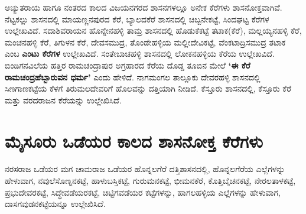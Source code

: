 ಅಚ್ಯುತರಾಯ ಹಾಗೂ ನಂತರದ ಕಾಲದ ವಿಜಯನಗರದ ಶಾಸನಗಳಲ್ಲೂ ಅನೇಕ ಕೆರೆಗಳು ಶಾಸನೋಕ್ತವಾಗಿವೆ. ನೆಟ್ಟಕಲ್ಲು ಶಾಸನದಲ್ಲಿ ಮಾಯಣ್ಣನಪುರದ ಕೆರೆ, ಬ್ಯಾಲದಕೆರೆ ಶಾಸನದಲ್ಲಿ ಚಿಬ್ಬನೇಕಟ್ಟೆ, ಸಿಂದಘಟ್ಟ ಕೆರೆಗಳ ಉಲ್ಲೇಖವಿದೆ. ಸದಾಶಿವರಾಯನ ಹೊನ್ನೇನಹಳ್ಳಿ ತಾಮ್ರ ಶಾಸನದಲ್ಲಿ ಹೊಡುಕೆಕಟ್ಟೆ ತಟಾಕ(ಕೆರೆ), ಮಲ್ಲಯ್ಯನಹಳ್ಳಿ ಕೆರೆ, ಮಂಚನಹಳ್ಳಿ ಕೆರೆ, ತಿಗುಳನ ಕೆರೆ, ದೇವಸಮುದ್ರ, ತೊಂಡೇಹಳ್ಳಿಯ ಮಲ್ಲೀದೇವಿಕಟ್ಟೆ, ವೆಂಕಟಾದ್ರಿಸಮುದ್ರ ತಟಾಕ ಎಂಬ \textbf{ಎಂಟು ಕೆರೆಗಳ} ಉಲ್ಲೇಖವಿದೆ. ಸಂತೇಬಾಚಹಳ್ಳಿ ಶಾಸನದಲ್ಲಿ ಲೋಕನಹಳ್ಳಿಯ ಕೆರೆಯ ಉಲ್ಲೇಖವಿದೆ. ಬಿಂಡಿಗನವಿಲೆಯ ಹತ್ತಿರ ರಾಮಚಂದ್ರಾಪುರ ಅಗ್ರಹಾರದ ಕೆರೆಯ ದೊಡ್ಡ ತೂಬಿನ ಮೇಲೆ \textbf{‘ಈ ಕೆರೆ ರಾಮಚಂದ್ರಹೆಬ್ಬಾರುವನ ಧರ್ಮ’} ಎಂದು ಹೇಳಿದೆ. ನಾಗಮಂಗಲ ತಾಲ್ಲೂಕು ದೇವರಹಳ್ಳಿ ಶಾಸನದಲ್ಲಿ ಸಿಣಗಾಣಕಟ್ಟೆಯ ಕೆಳಗೆ ತಿರುಮಲದೇವರಿಗೆ ಹೊಲವನ್ನು ದತ್ತಿಯಾಗಿ ನೀಡಿದೆ. ಕೆಸ್ತೂರು ಶಾಸನದಲ್ಲಿ, ಕೆಸ್ತೂರು ಕೆರೆ ಮತ್ತು ವರದರಾಜನ ಕೆರೆಯನ್ನು ಉಲ್ಲೇಖಿಸಿದೆ.

\section*{ಮೈಸೂರು ಒಡೆಯರ ಕಾಲದ ಶಾಸನೋಕ್ತ ಕೆರೆಗಳು}

ನರಸರಾಜ ಒಡೆಯರ ಮಗ ಚಾಮರಾಜ ಒಡೆಯರ ಹೊನ್ನಲಗೆರೆ ದತ್ತಿಶಾಸನದಲ್ಲಿ, ಹೊನ್ನಲಗೆರೆಯ ಎಲ್ಲೆಗಳನ್ನು ಹೇಳುವಾಗ, ನವುಲೆಸೊಣ್ನನಕಟ್ಟೆ, ಹಾಳುಬಸ್ತಿಕಟ್ಟೆ, ಗುರುಮನಕಟ್ಟೆ, ಭೀಮನಕೆರೆ, ಕೊತ್ತಿಬೈಚನಕಟ್ಟೆ, ನೇರಲತಾಳಕಟ್ಟೆ, ಪ್ರಭುದೇವರಕಟ್ಟೆ, ಸಿದ್ಧೇವಡೆಯರಕಟ್ಟೆ, ಚಿಟ್ಟಿಗವಡೆಯರ ಕಟ್ಟೆಗಳನ್ನು, ಹಾಗಲಹಳ್ಳಿಯ ಎಲ್ಲೆಗಳನ್ನು ಹೇಳುವಾಗ, ದಾಸಗವುಡನಕಟ್ಟೆಯನ್ನೂ ಉಲ್ಲೇಖಿಸಿದೆ.

